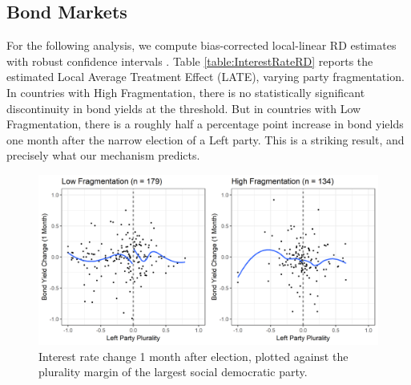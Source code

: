 \documentclass[12pt]{article}
\begin{document}
\subsection{Bond Markets}

For the following analysis, we compute bias-corrected local-linear RD estimates with robust confidence intervals \citep{Calonico2014}. Table \ref{table:InterestRateRD} reports the estimated Local Average Treatment Effect (LATE), varying party fragmentation. In countries with High Fragmentation, there is no statistically significant discontinuity in bond yields at the threshold. But in countries with Low Fragmentation, there is a roughly half a percentage point increase in bond yields one month after the narrow election of a Left party. This is a striking result, and precisely what our mechanism predicts.

\begin{figure}[h]
\centering
\includegraphics[width=\linewidth]{Figures/interestRateRDFigure}
\caption{Interest rate change 1 month after election, plotted against the plurality margin of the largest social democratic party.}
\label{fig:interestraterdfigure}
\end{figure}
\end{document}
